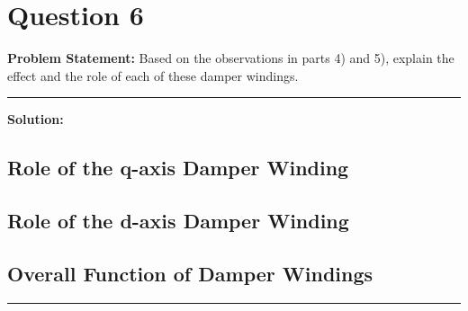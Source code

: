 \clearpage
\section*{Question 6}

\textbf{Problem Statement:} Based on the observations in parts 4) and 5), explain the effect and the role of each of these damper windings.

\vspace{1em}
\noindent\rule{\textwidth}{0.4pt}
\vspace{1em}

\textbf{Solution:}

\subsection*{Role of the q-axis Damper Winding}


\subsection*{Role of the d-axis Damper Winding}


\subsection*{Overall Function of Damper Windings}


\vspace{1em}
\noindent\rule{\textwidth}{0.4pt}
